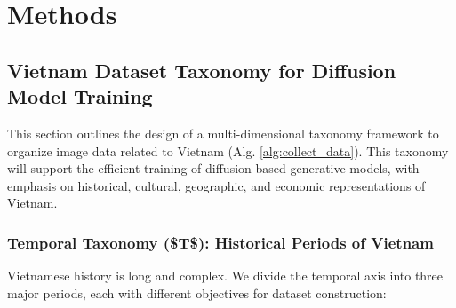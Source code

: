 \documentclass[conference]{IEEEtran}
\begin{document}
\section{Methods}
\label{sec:medthods}
\subsection{Vietnam Dataset Taxonomy for Diffusion Model Training}

This section outlines the design of a multi-dimensional taxonomy framework to organize image data related to Vietnam (Alg. \ref{alg:collect_data}). This taxonomy will support the efficient training of diffusion-based generative models, with emphasis on historical, cultural, geographic, and economic representations of Vietnam.
\subsubsection{Temporal Taxonomy (\$T\$): Historical Periods of Vietnam}

Vietnamese history is long and complex. We divide the temporal axis into three major periods, each with different objectives for dataset construction:
\end{document}
